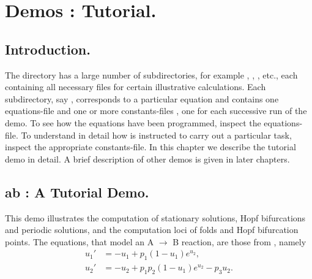 

\chapter{ \AUTO Demos : Tutorial.} \label{ch:Demos:_Tutorial}
\newpage
\section{ Introduction.} \label{sec:Tutorial_Introduction}
The directory  has a large number of subdirectories,
for example , , , etc.,
each containing all necessary files for certain illustrative calculations.
Each subdirectory, say , corresponds to a particular equation
and contains one equations-file 
and one or more constants-files , 
one for each successive run of the demo.
To see how the equations have been programmed, inspect the equations-file. 
To understand in detail how \AUTO is instructed to carry out a 
particular task, inspect the appropriate constants-file.
In this chapter we describe the tutorial demo  in detail.
A brief description of other demos is given in later chapters.


\section{ ab : A Tutorial Demo.} \label{sec:Demos_ab}
This demo illustrates the computation of 
stationary solutions,
Hopf bifurcations 
and 
periodic solutions,
and the computation loci of folds and Hopf bifurcation points.
The equations, that model an A $\to$ B  reaction, are those from
 \citeyear{URP:74}, namely
\begin{equation} \begin{array}{cl}
  u_1 ' &=  -u_1 + p_1 (1-u_1) e^{u_2}, \\
  u_2 ' &=  -u_2 +  p_1 p_2 ( 1-u_1) e^{u_2} - p_3 u_2.\\
\end{array} \end{equation}

